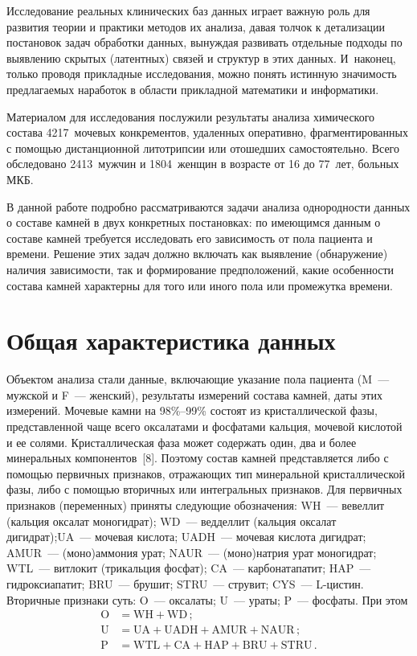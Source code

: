 \begin{multicols}{2}
      Исследование реальных клинических баз данных играет важную роль для развития 
теории и практики методов их анализа, давая толчок к детализации постановок задач 
обработки данных, вынуждая развивать отдельные подходы по выявлению скрытых 
(латентных) связей и структур в этих данных. И~наконец, только проводя прикладные 
исследования, можно понять истинную значимость предлагаемых наработок в области 
прикладной математики и информатики. 
      
      Материалом для исследования послужили резуль\-таты анализа химического состава 
4217~мочевых конкрементов, удаленных оперативно, фрагментированных с помощью 
дистанционной ли\-то\-трип\-сии или отошедших самостоятельно. Всего обследовано 
2413~мужчин и 1804~женщин в воз\-рас\-те от 16 до 77~лет, больных МКБ.
      
      В данной работе подробно рассматриваются задачи анализа однородности данных о 
составе камней в двух конкретных постановках: по имеющимся данным о составе камней 
требуется исследовать его зависимость от пола пациента и времени. Решение этих задач 
должно включать как выявление (обнаружение) наличия зависимости, так и формирование 
предположений, какие особенности состава камней характерны для того или иного пола или 
промежутка времени. 

\section{Общая характеристика данных}

      Объектом анализа стали данные, включающие указание пола пациента (M~--- 
мужской и F~--- женский), результаты измерений состава камней, даты этих измерений. 
Мочевые камни на 98\%--99\% состоят из кристаллической фазы, представленной чаще всего 
оксалатами и фосфатами кальция, мочевой кислотой и ее солями. Кристаллическая фаза 
может содержать один, два и более минеральных компонентов~[8]. Поэтому состав камней 
представляется либо с помощью первичных признаков, отражающих тип минеральной 
кристаллической фазы, либо с помощью вторичных или интегральных признаков. Для 
первичных признаков (переменных) приняты следующие обозначения: WH~--- вевеллит 
(кальция оксалат моногидрат); WD~--- ведделлит (кальция оксалат дигидрат);\linebreak UA~--- 
мочевая кис\-ло\-та; UADH~--- мочевая кис\-ло\-та дигидрат; AMUR~--- (мо\-но)ам\-мо\-ния урат; 
NAUR~--- (мо\-но)нат\-рия урат моногидрат; WTL~--- витлокит (трикальция фосфат); CA~--- 
карбонатапатит; HAP~--- гид\-ро\-кси\-а\-па\-тит; BRU~--- брушит; STRU~--- струвит; 
      CYS~--- L-цис\-тин. Вторичные признаки суть: O~--- оксалаты; U~--- ураты; P~--- 
фосфаты. При этом 
\begin{align*}
\mathrm{O}&=\mathrm{WH+WD}\,; \\
\mathrm{U}&=\mathrm{UA}+\mathrm{UADH}+\mathrm{AMUR}+ \mathrm{NAUR}\,;\\ 
\mathrm{P}&=\mathrm{WTL}+\mathrm{CA}+\mathrm{HAP}+\mathrm{BRU}+\mathrm{STRU}\,.
\end{align*}


\end{multicols}

